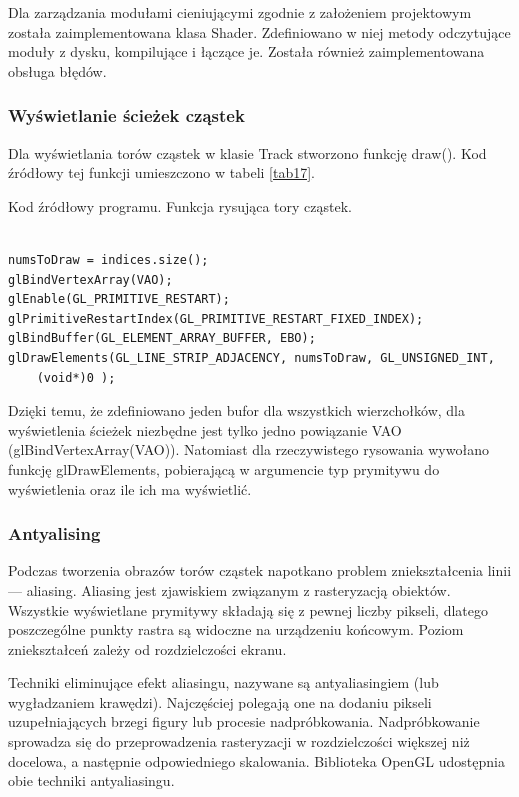 Dla zarządzania modułami cieniującymi zgodnie z założeniem projektowym została zaimplementowana klasa Shader. Zdefiniowano w niej metody odczytujące moduły z dysku, kompilujące i łączące je. Została również zaimplementowana obsługa błędów.

\subsubsection{Wyświetlanie ścieżek cząstek}

Dla wyświetlania torów cząstek w klasie Track stworzono funkcję draw(). Kod źródłowy tej funkcji umieszczono w tabeli \ref{tab17}.

\begin{table}[H]
\caption{Kod źródłowy programu. Funkcja rysująca tory cząstek.}
\label{tab17}
\begin{lstlisting}[frame=single]  % Start your code-block

numsToDraw = indices.size();
glBindVertexArray(VAO);
glEnable(GL_PRIMITIVE_RESTART);
glPrimitiveRestartIndex(GL_PRIMITIVE_RESTART_FIXED_INDEX);
glBindBuffer(GL_ELEMENT_ARRAY_BUFFER, EBO);
glDrawElements(GL_LINE_STRIP_ADJACENCY, numsToDraw, GL_UNSIGNED_INT, 
	(void*)0 );
\end{lstlisting}
\end{table}
Dzięki temu, że zdefiniowano jeden bufor dla wszystkich wierzchołków, dla wyświetlenia ścieżek niezbędne jest tylko jedno powiązanie VAO (glBindVertexArray(VAO)). Natomiast dla rzeczywistego rysowania wywołano funkcję glDrawElements, pobierającą w argumencie typ prymitywu do wyświetlenia oraz ile ich ma wyświetlić.

\subsubsection{Antyalising}
Podczas tworzenia obrazów torów cząstek napotkano problem zniekształcenia linii --- aliasing. Aliasing jest zjawiskiem związanym z rasteryzacją obiektów. Wszystkie wyświetlane prymitywy składają się z pewnej liczby pikseli, dlatego poszczególne punkty rastra są widoczne na urządzeniu końcowym. Poziom zniekształceń zależy od rozdzielczości ekranu.

Techniki eliminujące efekt aliasingu, nazywane są antyaliasingiem (lub wygładzaniem krawędzi). Najczęściej polegają one na dodaniu pikseli uzupełniających brzegi figury lub procesie nadpróbkowania. Nadpróbkowanie sprowadza się do przeprowadzenia rasteryzacji w rozdzielczości większej niż docelowa, a następnie odpowiedniego skalowania. Biblioteka OpenGL udostępnia obie techniki antyaliasingu.

